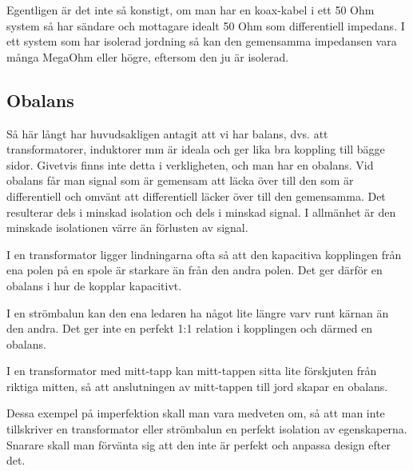 Egentligen är det inte så konstigt, om man har en koax-kabel i ett 50 Ohm
system så har sändare och mottagare idealt 50 Ohm som differentiell impedans.
I ett system som har isolerad jordning så kan den gemensamma impedansen vara
många MegaOhm eller högre, eftersom den ju är isolerad.

\subsection{Obalans}

Så här långt har huvudsakligen antagit att vi har balans, dvs. att
transformatorer, induktorer mm är ideala och ger lika bra koppling till bägge
sidor. Givetvis finns inte detta i verkligheten, och man har en obalans.
Vid obalans får man signal som är gemensam att läcka över till den som är
differentiell och omvänt att differentiell läcker över till den gemensamma.
Det resulterar dels i minskad isolation och dels i minskad signal.
I allmänhet är den minskade isolationen värre än förlusten av signal.

I en transformator ligger lindningarna ofta så att den kapacitiva kopplingen
från ena polen på en spole är starkare än från den andra polen.
Det ger därför en obalans i hur de kopplar kapacitivt.

I en strömbalun kan den ena ledaren ha något lite längre varv runt kärnan än
den andra. Det ger inte en perfekt 1:1 relation i kopplingen och därmed en
obalans.

I en transformator med mitt-tapp kan mitt-tappen sitta lite förskjuten från
riktiga mitten, så att anslutningen av mitt-tappen till jord skapar en
obalans.

Dessa exempel på imperfektion skall man vara medveten om, så att man inte
tillskriver en transformator eller strömbalun en perfekt isolation av
egenskaperna. Snarare skall man förvänta sig att den inte är perfekt och
anpassa design efter det.
